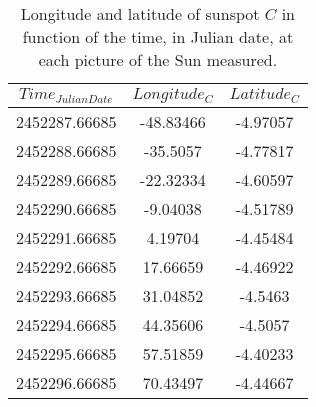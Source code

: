 \begin{table}[H]
	\centering
	\begin{tabular}{ c  c  c }
		\\\hline
		\centering
			$Time_{Julian Date}$ & $Longitude_{C}$ & $Latitude_{C}$ \\\hline
			2452287.66685 & -48.83466 & -4.97057 \\
			2452288.66685 & -35.5057 & -4.77817 \\
			2452289.66685 & -22.32334 & -4.60597 \\
			2452290.66685 & -9.04038 & -4.51789 \\
			2452291.66685 & 4.19704 & -4.45484 \\
			2452292.66685 & 17.66659 & -4.46922 \\
			2452293.66685 & 31.04852 & -4.5463 \\
			2452294.66685 & 44.35606 & -4.5057 \\
			2452295.66685 & 57.51859 & -4.40233 \\
			2452296.66685 & 70.43497 & -4.44667 \\\hline
	\end{tabular}
	\caption{\label{Tab:sunspotC}Longitude and latitude of sunspot $C$ in function of the time, in Julian date, at each picture of the Sun measured.}
\end{table}
